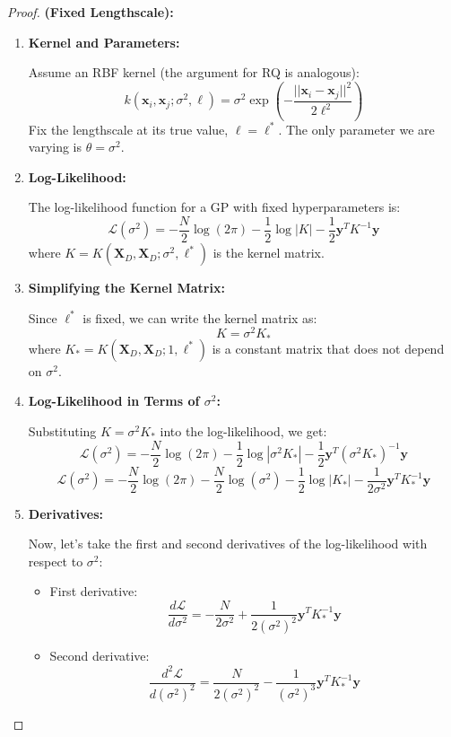 \begin{proof}
\textbf{(Fixed Lengthscale):}

\begin{enumerate}
    \item \textbf{Kernel and Parameters:}

    Assume an RBF kernel (the argument for RQ is analogous):
    $$
    k(\mathbf{x}_i, \mathbf{x}_j; \sigma^2, \ell) = \sigma^2 \exp\left(-\frac{||\mathbf{x}_i - \mathbf{x}_j||^2}{2\ell^2}\right)
    $$
    Fix the lengthscale at its true value, $\ell = \ell^*$.
    The only parameter we are varying is $\theta = \sigma^2$.

    \item \textbf{Log-Likelihood:}

    The log-likelihood function for a GP with fixed hyperparameters is:
    $$
    \mathcal{L}(\sigma^2) = -\frac{N}{2} \log(2\pi) - \frac{1}{2} \log |K| - \frac{1}{2} \mathbf{y}^T K^{-1} \mathbf{y}
    $$
    where $K = K(\mathbf{X}_D, \mathbf{X}_D; \sigma^2, \ell^*)$ is the kernel matrix.

    \item \textbf{Simplifying the Kernel Matrix:}

    Since $\ell^*$ is fixed, we can write the kernel matrix as:
    $$
    K = \sigma^2 K_*
    $$
    where $K_* = K(\mathbf{X}_D, \mathbf{X}_D; 1, \ell^*)$ is a constant matrix that does not depend on $\sigma^2$.

    \item \textbf{Log-Likelihood in Terms of $\sigma^2$:}

    Substituting $K = \sigma^2 K_*$ into the log-likelihood, we get:
    $$
    \mathcal{L}(\sigma^2) = -\frac{N}{2} \log(2\pi) - \frac{1}{2} \log |\sigma^2 K_*| - \frac{1}{2} \mathbf{y}^T (\sigma^2 K_*)^{-1} \mathbf{y}
    $$
    $$
    \mathcal{L}(\sigma^2) = -\frac{N}{2} \log(2\pi) - \frac{N}{2} \log(\sigma^2) - \frac{1}{2} \log |K_*| - \frac{1}{2\sigma^2} \mathbf{y}^T K_*^{-1} \mathbf{y}
    $$

    \item \textbf{Derivatives:}

    Now, let's take the first and second derivatives of the log-likelihood with respect to $\sigma^2$:
    \begin{itemize}
        \item First derivative:
        $$
        \frac{d\mathcal{L}}{d\sigma^2} = -\frac{N}{2\sigma^2} + \frac{1}{2(\sigma^2)^2} \mathbf{y}^T K_*^{-1} \mathbf{y}
        $$
        \item Second derivative:
        $$
        \frac{d^2\mathcal{L}}{d(\sigma^2)^2} = \frac{N}{2(\sigma^2)^2} - \frac{1}{(\sigma^2)^3} \mathbf{y}^T K_*^{-1} \mathbf{y}
        $$
    \end{itemize}


\end{enumerate}
\end{proof}
